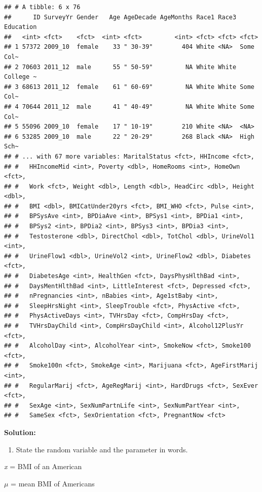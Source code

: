 \documentclass[]{book}
\providecommand{\tightlist}{%
  \setlength{\itemsep}{0pt}\setlength{\parskip}{0pt}}
\begin{document}
\begin{verbatim}
## # A tibble: 6 x 76
##      ID SurveyYr Gender   Age AgeDecade AgeMonths Race1 Race3 Education
##   <int> <fct>    <fct>  <int> <fct>         <int> <fct> <fct> <fct>    
## 1 57372 2009_10  female    33 " 30-39"        404 White <NA>  Some Col~
## 2 70603 2011_12  male      55 " 50-59"         NA White White College ~
## 3 68613 2011_12  female    61 " 60-69"         NA White White Some Col~
## 4 70644 2011_12  male      41 " 40-49"         NA White White Some Col~
## 5 55096 2009_10  female    17 " 10-19"        210 White <NA>  <NA>     
## 6 53285 2009_10  male      22 " 20-29"        268 Black <NA>  High Sch~
## # ... with 67 more variables: MaritalStatus <fct>, HHIncome <fct>,
## #   HHIncomeMid <int>, Poverty <dbl>, HomeRooms <int>, HomeOwn <fct>,
## #   Work <fct>, Weight <dbl>, Length <dbl>, HeadCirc <dbl>, Height <dbl>,
## #   BMI <dbl>, BMICatUnder20yrs <fct>, BMI_WHO <fct>, Pulse <int>,
## #   BPSysAve <int>, BPDiaAve <int>, BPSys1 <int>, BPDia1 <int>,
## #   BPSys2 <int>, BPDia2 <int>, BPSys3 <int>, BPDia3 <int>,
## #   Testosterone <dbl>, DirectChol <dbl>, TotChol <dbl>, UrineVol1 <int>,
## #   UrineFlow1 <dbl>, UrineVol2 <int>, UrineFlow2 <dbl>, Diabetes <fct>,
## #   DiabetesAge <int>, HealthGen <fct>, DaysPhysHlthBad <int>,
## #   DaysMentHlthBad <int>, LittleInterest <fct>, Depressed <fct>,
## #   nPregnancies <int>, nBabies <int>, Age1stBaby <int>,
## #   SleepHrsNight <int>, SleepTrouble <fct>, PhysActive <fct>,
## #   PhysActiveDays <int>, TVHrsDay <fct>, CompHrsDay <fct>,
## #   TVHrsDayChild <int>, CompHrsDayChild <int>, Alcohol12PlusYr <fct>,
## #   AlcoholDay <int>, AlcoholYear <int>, SmokeNow <fct>, Smoke100 <fct>,
## #   Smoke100n <fct>, SmokeAge <int>, Marijuana <fct>, AgeFirstMarij <int>,
## #   RegularMarij <fct>, AgeRegMarij <int>, HardDrugs <fct>, SexEver <fct>,
## #   SexAge <int>, SexNumPartnLife <int>, SexNumPartYear <int>,
## #   SameSex <fct>, SexOrientation <fct>, PregnantNow <fct>
\end{verbatim}

\textbf{Solution:}

\begin{enumerate}
\def\labelenumi{\arabic{enumi}.}
\tightlist
\item
  State the random variable and the parameter in words.
\end{enumerate}

\emph{x} = BMI of an American

\(\mu\) = mean BMI of Americans
\end{document}
